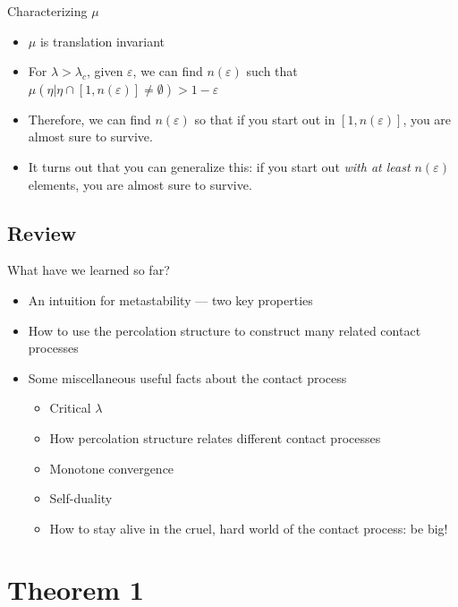 \documentclass{beamer}
\newcommand{\ep}{\varepsilon}
\begin{document}
\begin{frame}{Characterizing $\mu$}
  \begin{itemize}
    \item $\mu$ is translation invariant
          \pause
    \item For $\lambda > \lambda_{c}$, given $\ep$, we can find $n(\ep)$ such that $\mu(\eta | \eta \cap [1,n(\ep)] \neq \emptyset) > 1 - \ep$
          \pause
    \item Therefore, we can find $n(\ep)$ so that if you start out in $[1,n(\ep)]$, you are almost sure to survive.
          \pause
    \item It turns out that you can generalize this: if you start out \emph{with at least $n(\ep)$} elements, you are almost sure to survive.
  \end{itemize}
\end{frame}

\subsection{Review}

\begin{frame}
  What have we learned so far?
  \begin{itemize}
    \item An intuition for metastability --- two key properties
          \pause
    \item How to use the percolation structure to construct many related contact processes
          \pause
    \item Some miscellaneous useful facts about the contact process
          \pause
          \begin{itemize}
            \item Critical $\lambda$
                  \pause
            \item How percolation structure relates different contact processes
                  \pause
            \item Monotone convergence
                  \pause
            \item Self-duality
                  \pause
            \item How to stay alive in the cruel, hard world of the contact process: be big!
          \end{itemize}
  \end{itemize}
\end{frame}

\section{Theorem 1}
\end{document}
